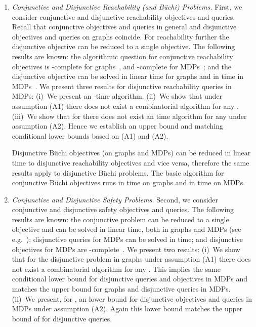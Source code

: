 \documentclass[11pt,letterpaper]{article}
\newcommand{\lu}{\textup{(}}
\newcommand{\ru}{\textup{)}\xspace}
\newcommand{\upbr}[1]{\lu #1\ru}
\newif\iffullversion
\newcommand{\infull}[1]{\iffullversion #1\fi}
\begin{document}
\begin{enumerate}
\item
\emph{Conjunctive and Disjunctive Reachability \upbr{and Büchi} Problems.} 
    First, we consider conjunctive and disjunctive reachability objectives and 
    queries. Recall that conjunctive objectives and queries in general
    and disjunctive objectives and queries on graphs coincide. For reachability
    further the disjunctive objective can be reduced to a single objective\infull{ (see 
    Observation~\ref{obs:disjobjreach})}.
    The following results are known: the algorithmic question for conjunctive 
    reachability objectives is \NP-complete for 
    graphs~\cite{ChatterjeeAM13}, and \PSPACE-complete for MDPs~\cite{FijalkowH12};
    and the disjunctive objective 
    can be solved in linear time for graphs
    and in  time in MDPs~\cite{ChatterjeeJH03,ChatterjeeH14}.
    We present three results for disjunctive reachability queries in MDPs: 
    (i)~We present an -time algorithm\infull{\footnote{This implies an -time algorithm for disjunctive objective but does not 
    improve the running time for this case.}}.
    (ii)~We show that under assumption (A1) there does not exist a combinatorial
     algorithm for any .
    (iii)~We show that for  
    there does not exist an 
     time algorithm for any  under assumption (A2). 
     Hence we establish an upper bound and matching conditional lower bounds
     based on (A1) and (A2).

		Disjunctive Büchi objectives (on graphs and MDPs) 
		can be reduced in linear time to disjunctive
		reachability objectives and vice versa, therefore 
		the same results apply to disjunctive Büchi problems\infull{ (see Observation~\ref{obs:Reachability_Buchi})}.
		The basic algorithm for conjunctive Büchi objectives runs in time 
		on graphs and in time  on MDPs.
 
\item
\emph{Conjunctive and Disjunctive Safety Problems.}
    Second, we consider conjunctive and disjunctive safety objectives and queries.
    The following results are known: the conjunctive problem can be reduced
    to a single objective and can be solved in linear 
    time, both in graphs and MDPs (see e.g.~\cite{ChatterjeeDH10}); disjunctive queries for MDPs can be solved in  time; and disjunctive objectives for MDPs
    are \PSPACE-complete~\cite{FijalkowH12}.
    We present two results: 
    (i)~We show that for the disjunctive problem in graphs 
    under assumption (A1) there does not exist a combinatorial
     algorithm for any .
    This implies the same conditional lower bound for disjunctive queries
    and objectives in MDPs and matches the upper bound for graphs 
    and disjunctive queries in MDPs.
    (ii)~We present, for ,
    an  lower bound for disjunctive 
    objectives and queries in MDPs under assumption (A2). 
    Again this lower bound matches the upper bound of 
    for disjunctive queries.


\end{enumerate}
\end{document}

